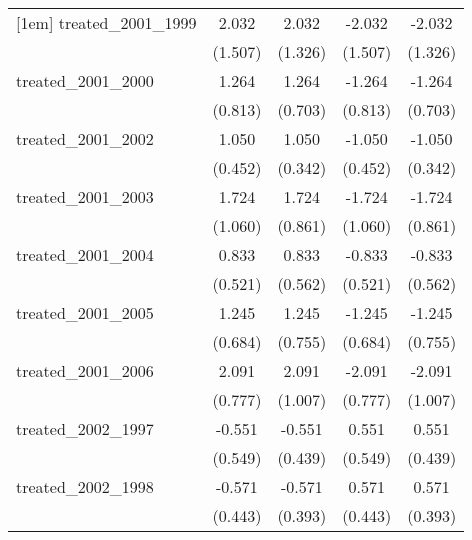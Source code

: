 {\begin{tabular}{l*{4}{c}}
[1em]
treated\_2001\_1999&       2.032         &       2.032         &      -2.032         &      -2.032         \\
            &     (1.507)         &     (1.326)         &     (1.507)         &     (1.326)         \\
[1em]
treated\_2001\_2000&       1.264         &       1.264         &      -1.264         &      -1.264         \\
            &     (0.813)         &     (0.703)         &     (0.813)         &     (0.703)         \\
[1em]
treated\_2001\_2002&       1.050\sym{*}  &       1.050\sym{**} &      -1.050\sym{*}  &      -1.050\sym{**} \\
            &     (0.452)         &     (0.342)         &     (0.452)         &     (0.342)         \\
[1em]
treated\_2001\_2003&       1.724         &       1.724\sym{*}  &      -1.724         &      -1.724\sym{*}  \\
            &     (1.060)         &     (0.861)         &     (1.060)         &     (0.861)         \\
[1em]
treated\_2001\_2004&       0.833         &       0.833         &      -0.833         &      -0.833         \\
            &     (0.521)         &     (0.562)         &     (0.521)         &     (0.562)         \\
[1em]
treated\_2001\_2005&       1.245         &       1.245         &      -1.245         &      -1.245         \\
            &     (0.684)         &     (0.755)         &     (0.684)         &     (0.755)         \\
[1em]
treated\_2001\_2006&       2.091\sym{**} &       2.091\sym{*}  &      -2.091\sym{**} &      -2.091\sym{*}  \\
            &     (0.777)         &     (1.007)         &     (0.777)         &     (1.007)         \\
[1em]
treated\_2002\_1997&      -0.551         &      -0.551         &       0.551         &       0.551         \\
            &     (0.549)         &     (0.439)         &     (0.549)         &     (0.439)         \\
[1em]
treated\_2002\_1998&      -0.571         &      -0.571         &       0.571         &       0.571         \\
            &     (0.443)         &     (0.393)         &     (0.443)         &     (0.393)         \\

\end{tabular}}
